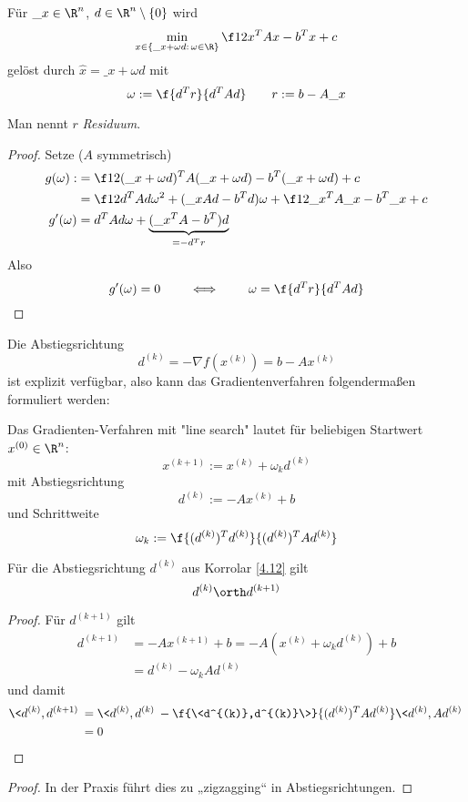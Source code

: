 \documentclass[11pt]{scrbook}
\begin{document}
\begin{st}[1D-Optimierung] \label{4.11}
	Für $\_x \in \R^n$, $d\in \R^n \setminus \{0\}$ wird
	\[
		\min_{x \in \{\_x + \omega d : \, \omega \in \R\}} \f 12 x^T A x - b^T x + c
	\]
	gelöst durch $\hat x = \_x + \omega d$ mit
	\[
		\omega := \f {d^T r}{d^T A d} \qquad r := b - A\_x
	\]
	\begin{note}
		Man nennt $r$ \emph{Residuum}.
	\end{note}
	\begin{proof}
		Setze ($A$ symmetrisch)
		\begin{align*}
			g(\omega) :&= \f 12 (\_x+\omega d)^TA(\_x + \omega d) - b^T(\_x + \omega d) +c \\
			&= \f 12 d^T Ad \omega^2 + (\_x Ad - b^T d)\omega + \f 12 \_x^T A\_x - b^T \_x + c  \\
			g'(\omega) &= d^T Ad \omega + \underbrace{(\_x^TA - b^T)d}_{=-d^T r}
		\end{align*}
		Also
		\[
			g'(\omega) = 0 \qquad \iff \qquad \omega = \f {d^T r}{d^T A d}
		\]
	\end{proof}
\end{st}

Die Abstiegsrichtung
\[
	d^{(k)} = -\nabla f(x^{(k)}) = b - Ax^{(k)}
\]
ist explizit verfügbar, also kann das Gradientenverfahren folgendermaßen formuliert werden:

\begin{kor} \label{4.12}
	Das Gradienten-Verfahren mit "line search" lautet für beliebigen Startwert $x^{(0)} \in \R^n$:
	\[
		x^{(k+1)} := x^{(k)} + \omega_k d^{(k)}
	\]
	mit Abstiegsrichtung
	\[
		d^{(k)} := -Ax^{(k)} + b
	\]
	und Schrittweite
	\[
		\omega_k := \f {(d^{(k)})^T d^{(k)}}{(d^{(k)})^T A d^{(k)}}
	\]
\end{kor}

\begin{st} \label{4.13}
	Für die Abstiegsrichtung $d^{(k)}$ aus Korrolar \ref{4.12} gilt
	\[
		d^{(k)} \orth d^{(k+1)}
	\]
	\begin{proof}
		Für $d^{(k+1)}$ gilt
		\begin{align*}
			d^{(k+1)} &= -Ax^{(k+1)} + b = -A(x^{(k)} + \omega_k d^{(k)}) + b \\
			&= d^{(k)} - \omega_k A d^{(k)}
		\end{align*}
		und damit
		\begin{align*}
			\< d^{(k)} , d^{(k+1)} \> 
			&= \<d^{(k)}, d^{(k)}\> - \f {\<d^{(k)},d^{(k)}\>}{(d^{(k)})^TAd^{(k)}} \<d^{(k)}, Ad^{(k)}\> \\
			&= 0
		\end{align*}
	\end{proof}
	\begin{proof}
		In der Praxis führt dies zu „zigzagging“ in Abstiegsrichtungen.
	\end{proof}
\end{st}
\end{document}
